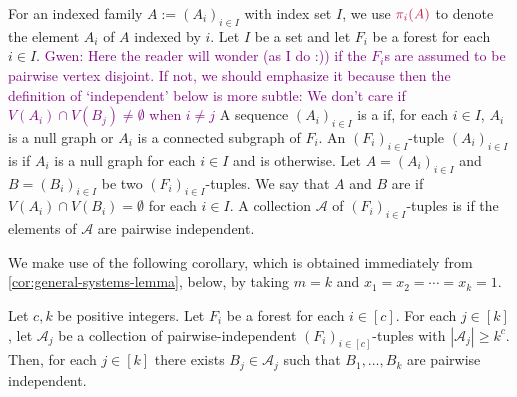 \documentclass{patmorin}
\newcommand{\pat}[1]{\textcolor{Blue}{[Pat: #1]}}
\newcommand{\gwen}[1]{\textcolor{Purple}{Gwen: #1}}
\newcommand{\mset}[1]{\{\!\{#1\}\!\}}
\begin{document}
For an indexed family $A:=(A_i)_{i\in I}$ with index set $I$, we use $\mathdefin{\pi_i(A)}$ to denote the element $A_i$ of $A$ indexed by $i$.
Let $I$ be a set
and let $F_i$ be a forest for each $i\in I$.
\gwen{Here the reader will wonder (as I do :)) if the $F_i$s are assumed to be pairwise vertex disjoint.
If not, we should emphasize it because then the definition of `independent' below is more subtle: We don't care if $V(A_i)\cap V(B_j) \neq \emptyset$ when $i\neq j$}
A sequence $(A_i)_{i\in I}$ is a  if, for each $i\in I$, $A_i$ is a null graph or $A_i$ is a connected subgraph of $F_i$.  An $(F_i)_{i\in I}$-tuple $(A_i)_{i\in I}$ is  if $A_i$ is a null graph for each $i\in I$ and is  otherwise.
Let $A=(A_i)_{i\in I}$ and $B=(B_i)_{i\in I}$ be two $(F_i)_{i\in I}$-tuples.
We say that $A$ and $B$ are  if
$V(A_i)\cap V(B_i)=\emptyset$ for each $i\in I$.
A collection $\mathcal{A}$ of $(F_i)_{i\in I}$-tuples is  if the elements of $\mathcal{A}$ are pairwise independent.


We make use of the following corollary, which is obtained immediately from \cref{cor:general-systems-lemma}, below, by  taking $m=k$ and $x_1=x_2=\cdots=x_k=1$.

\begin{cor}
\label{cor:interface-for-systems-lemma}
Let $c,k$ be positive integers.
Let $F_i$ be a forest for each $i\in[c]$.
For each $j\in [k]$,
let $\mathcal{A}_j$ be a collection of pairwise-independent $(F_i)_{i\in[c]}$-tuples with $|\mathcal{A}_j|\geq k^c$.
Then, for each $j\in[k]$ there exists
$B_j \in \mathcal{A}_j$ such that $B_1,\ldots,B_k$ are pairwise independent.
\end{cor}
\end{document}
